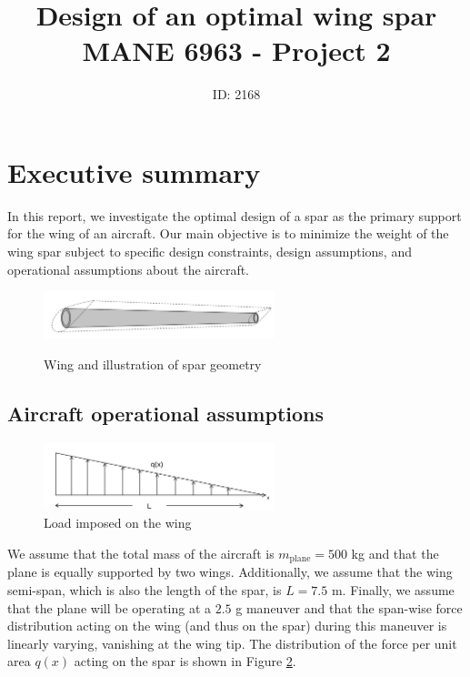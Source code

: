 \documentclass[11pt]{article}
\title{Design of an optimal wing spar\\MANE 6963 - Project 2}
\author{ID: 2168}
\date{}
\begin{document}
\maketitle

\section{Executive summary}

In this report, we investigate the optimal design of a spar
as the primary support for the wing of an aircraft. Our
main objective is to minimize the weight of the wing spar
subject to specific design constraints, design assumptions,
and operational assumptions about the aircraft.

\begin{figure}[hbt]
\centering
\includegraphics[width=0.6\textwidth]{spar}
\label{fig:spar}
\caption{Wing and illustration of spar geometry}
\end{figure}

\subsection{Aircraft operational assumptions}

\begin{figure}[hbt]
\centering
\includegraphics[width=0.6\textwidth]{load}
\caption{Load imposed on the wing}
\label{fig:load}
\end{figure}

We assume that the total mass of the aircraft is
$m_{\text{plane}} = 500$ kg and that the plane
is equally supported by two wings. 
Additionally, we assume that the wing semi-span,
which is also the length of the spar, is
$L = 7.5$ m. Finally,
we assume that the plane will be operating at
a $2.5$ g maneuver and that the span-wise force
distribution acting on the wing
(and thus on the spar) during this maneuver
is linearly varying, vanishing at the wing tip.
The distribution of the force per unit area $q(x)$
acting on the spar is shown in Figure \ref{fig:load}.
\end{document}
